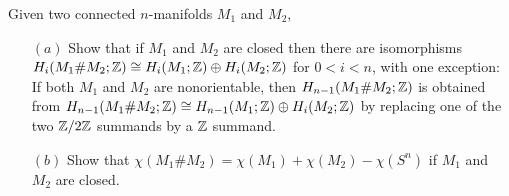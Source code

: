 \begin{exercise}
Given two connected $n$-manifolds $M_1$ and $M_2$,
\begin{itemize}
\item[$(a)$]Show that if $M_1$ and $M_2$ are closed then there are isomorphisms $H_i(M_1\#M_2;\mathbb{Z})\cong H_i(M_1;\mathbb{Z})\oplus H_i(M_2;\mathbb{Z})$ for $0<i<n$, with one exception: If both $M_1$ and $M_2$ are nonorientable, then $H_{n-1}(M_1\#M_2;\mathbb{Z})$ is obtained from $H_{n-1}(M_1\#M_2;\mathbb{Z})\cong H_{n-1}(M_1;\mathbb{Z})\oplus H_i(M_2;\mathbb{Z})$ by replacing one of the two $\mathbb{Z}/2\mathbb{Z}$ summands by a $\mathbb{Z}$ summand.
\item[$(b)$]Show that $\chi(M_1\#M_2)=\chi(M_1)+\chi(M_2)-\chi(S^n)$ if $M_1$ and $M_2$ are closed.
\end{itemize}
\end{exercise}